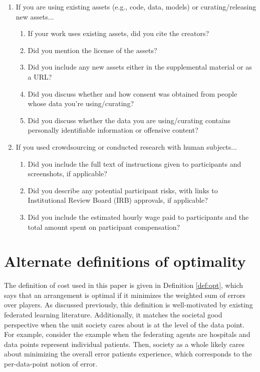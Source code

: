 \documentclass{article}
\begin{document}
{\begin{enumerate}
\item If you are using existing assets (e.g., code, data, models) or curating/releasing new assets...
\begin{enumerate}
  \item If your work uses existing assets, did you cite the creators?
  \item Did you mention the license of the assets?
    \answerNA{}
  \item Did you include any new assets either in the supplemental material or as a URL?
    \answerNA{}
  \item Did you discuss whether and how consent was obtained from people whose data you're using/curating?
    \answerNA{}
  \item Did you discuss whether the data you are using/curating contains personally identifiable information or offensive content?
    \answerNA{}
\end{enumerate}

\item If you used crowdsourcing or conducted research with human subjects...
\begin{enumerate}
  \item Did you include the full text of instructions given to participants and screenshots, if applicable?
    \answerNA{}
  \item Did you describe any potential participant risks, with links to Institutional Review Board (IRB) approvals, if applicable?
    \answerNA{}
  \item Did you include the estimated hourly wage paid to participants and the total amount spent on participant compensation?
    \answerNA{}
\end{enumerate}

\end{enumerate}}
{}

\newpage 
\appendix

\section{Alternate definitions of optimality}\label{app:otherdef}

The definition of cost used in this paper is given in Definition \ref{def:opt}, which says that an arrangement is optimal if it minimizes the weighted sum of errors over players. As discussed previously, this definition is well-motivated by existing federated learning literature. Additionally, it matches the societal good perspective when the unit society cares about is at the level of the data point. For example, consider the example when the federating agents are hospitals and data points represent individual patients. Then, society as a whole likely cares about minimizing the overall error patients experience, which corresponds to the per-data-point notion of error. 
\end{document}
